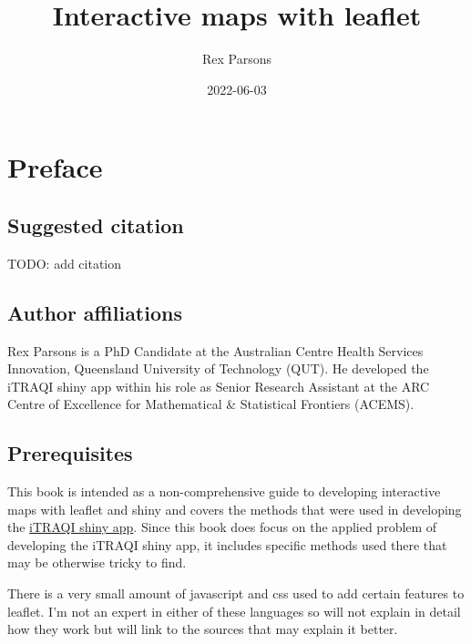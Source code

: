 \documentclass[
]{book}
\title{Interactive maps with leaflet}
\author{Rex Parsons}
\date{2022-06-03}
\begin{document}
\maketitle

{
\setcounter{tocdepth}{1}
\tableofcontents
}
\hypertarget{preface}{%
\chapter*{Preface}\label{preface}}

\hypertarget{suggested-citation}{%
\section*{Suggested citation}\label{suggested-citation}}

TODO: add citation

\hypertarget{author-affiliations}{%
\section*{Author affiliations}\label{author-affiliations}}

Rex Parsons is a PhD Candidate at the Australian Centre Health Services Innovation, Queensland University of Technology (QUT). He developed the iTRAQI shiny app within his role as Senior Research Assistant at the ARC Centre of Excellence for Mathematical \& Statistical Frontiers (ACEMS).

\hypertarget{prerequisites}{%
\section*{Prerequisites}\label{prerequisites}}

This book is intended as a non-comprehensive guide to developing interactive maps with leaflet and shiny and covers the methods that were used in developing the \href{https://access.healthequity.link/}{iTRAQI shiny app}. Since this book does focus on the applied problem of developing the iTRAQI shiny app, it includes specific methods used there that may be otherwise tricky to find.

There is a very small amount of javascript and css used to add certain features to leaflet. I'm not an expert in either of these languages so will not explain in detail how they work but will link to the sources that may explain it better.
\end{document}
